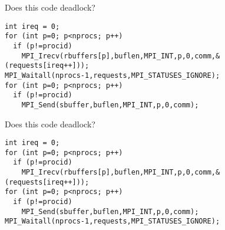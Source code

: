 \begin{reviewframe}
  Does this code deadlock?
\begin{lstlisting}
int ireq = 0;
for (int p=0; p<nprocs; p++)
  if (p!=procid)
    MPI_Irecv(rbuffers[p],buflen,MPI_INT,p,0,comm,&(requests[ireq++]));
MPI_Waitall(nprocs-1,requests,MPI_STATUSES_IGNORE);
for (int p=0; p<nprocs; p++)
  if (p!=procid)
    MPI_Send(sbuffer,buflen,MPI_INT,p,0,comm);
\end{lstlisting}
\end{reviewframe}

\begin{reviewframe}
  Does this code deadlock?
\begin{lstlisting}
int ireq = 0;
for (int p=0; p<nprocs; p++)
  if (p!=procid)
    MPI_Irecv(rbuffers[p],buflen,MPI_INT,p,0,comm,&(requests[ireq++]));
for (int p=0; p<nprocs; p++)
  if (p!=procid)
    MPI_Send(sbuffer,buflen,MPI_INT,p,0,comm);
MPI_Waitall(nprocs-1,requests,MPI_STATUSES_IGNORE);
\end{lstlisting}
\end{reviewframe}


\endinput

\begin{numberedframe}{}
\begin{lstlisting}
  
\end{lstlisting}
\end{numberedframe}

